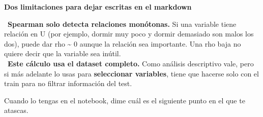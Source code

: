 \documentclass[11pt,a4paper]{article}
\begin{document}
{\smallskip\noindent\textbf{Dos limitaciones para dejar escritas en el markdown}\par
\hspace*{1.0em}\textbullet~\textbf{Spearman solo detecta relaciones monótonas.} Si una variable tiene relación en U (por ejemplo, dormir muy poco y dormir demasiado son malos los dos), puede dar rho \textasciitilde{} 0 aunque la relación sea importante. Una rho baja no quiere decir que la variable sea inútil. \\{}
\hspace*{1.0em}\textbullet~\textbf{Este cálculo usa el dataset completo.} Como análisis descriptivo vale, pero si más adelante lo usas para \textbf{seleccionar variables}, tiene que hacerse solo con el train para no filtrar información del test.

Cuando lo tengas en el notebook, dime cuál es el siguiente punto en el que te atascas.

}
\end{document}
